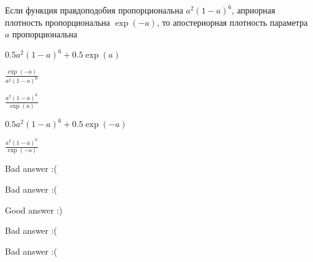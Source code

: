 
\begin{question}
Если функция правдоподобия пропорциональна \(a^2(1-a)^6\), априорная
плотность пропорциональна \(\exp(-a)\), то апостериорная плотность
параметра \(a\) пропорциональна
\begin{answerlist}
  \item \(0.5 a^2(1-a)^6 +0.5\exp(a)\)
  \item \(\frac{\exp(-a)}{a^2(1-a)^6}\)
  \item \(\frac{a^2(1-a)^6}{\exp(a)}\)
  \item \(0.5 a^2(1-a)^6 +0.5\exp(-a)\)
  \item \(\frac{a^2(1-a)^6}{\exp(-a)}\)
\end{answerlist}
\end{question}

\begin{solution}
\begin{answerlist}
  \item Bad answer :(
  \item Bad answer :(
  \item Good answer :)
  \item Bad answer :(
  \item Bad answer :(
\end{answerlist}
\end{solution}


